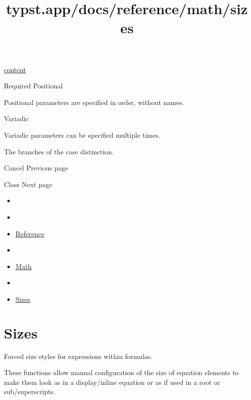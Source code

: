 \href{/docs/reference/foundations/content/}{content}

{Required} {{ Positional }}

\label{parameters-children-positional-tooltip}
Positional parameters are specified in order, without names.

{{ Variadic }}

\label{parameters-children-variadic-tooltip}
Variadic parameters can be specified multiple times.

The branches of the case distinction.

\href{/docs/reference/math/cancel/}{\pandocbounded{}}

{ Cancel } { Previous page }

\href{/docs/reference/math/class/}{\pandocbounded{}}

{ Class } { Next page }


\title{typst.app/docs/reference/math/sizes}

\begin{itemize}
\tightlist
\item
  \href{/docs}{}
\item
  
\item
  \href{/docs/reference/}{Reference}
\item
  
\item
  \href{/docs/reference/math/}{Math}
\item
  
\item
  \href{/docs/reference/math/sizes}{Sizes}
\end{itemize}

\section{Sizes}\label{summary}

Forced size styles for expressions within formulas.

These functions allow manual configuration of the size of equation
elements to make them look as in a display/inline equation or as if used
in a root or sub/superscripts.


